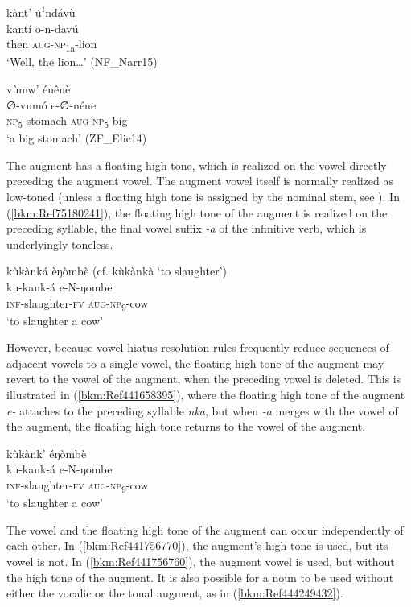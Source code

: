 \ea
\label{bkm:Ref444247873}
kànt’ úꜝndávù\\
\gll kantí  o-n-davú\\
then  \textsc{aug}-\textsc{np}\textsubscript{1a}-lion\\
\glt ‘Well, the lion…’ (NF\_Narr15)
\z

\ea
\label{bkm:Ref444247874}
vùmw’ énênè\\
\gll ∅-vumó  e-∅-néne\\
\textsc{np}\textsubscript{5}-stomach  \textsc{aug}-\textsc{np}\textsubscript{5}-big\\
\glt ‘a big stomach’ (ZF\_Elic14)
\z

The augment has a floating high tone, which is realized on the vowel directly preceding the augment vowel. The augment vowel itself is normally realized as low-toned (unless a floating high tone is assigned by the nominal stem, see ). In (\ref{bkm:Ref75180241}), the floating high tone of the augment is realized on the preceding syllable, the final vowel suffix \textit{-a} of the infinitive verb, which is underlyingly toneless.

\ea
\label{bkm:Ref75180241}
kùkànká èŋòmbè (cf. kùkànkà ‘to slaughter’)\\
\gll ku-kank-á    e-N-ŋombe\\
\textsc{inf}-slaughter-\textsc{fv}  \textsc{aug}-\textsc{np}\textsubscript{9}-cow\\
\glt ‘to slaughter a cow’
\z

However, because vowel hiatus resolution rules frequently reduce sequences of adjacent vowels to a single vowel, the floating high tone of the augment may revert to the vowel of the augment, when the preceding vowel is deleted. This is illustrated in (\ref{bkm:Ref441658395}), where the floating high tone of the augment \textit{e-} attaches to the preceding syllable \textit{nka}, but when \textit{-a} merges with the vowel of the augment, the floating high tone returns to the vowel of the augment.

\ea
\label{bkm:Ref441658395}
kùkànk’ éŋòmbè\\
\gll ku-kank-á    e-N-ŋombe\\
\textsc{inf}-slaughter-\textsc{fv}  \textsc{aug}-\textsc{np}\textsubscript{9}-cow\\
\glt ‘to slaughter a cow’
\z

The vowel and the floating high tone of the augment can occur independently of each other. In (\ref{bkm:Ref441756770}), the augment’s high tone is used, but its vowel is not. In (\ref{bkm:Ref441756760}), the augment vowel is used, but without the high tone of the augment. It is also possible for a noun to be used without either the vocalic or the tonal augment, as in (\ref{bkm:Ref444249432}).

